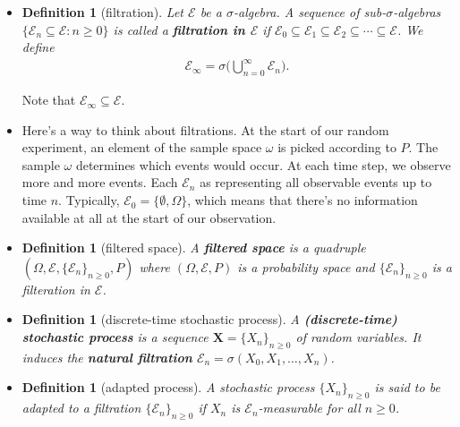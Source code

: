 \documentclass[10pt]{article}
\newtheorem{definition}[lemma]{Definition}
\numberwithin{lemma}{section}
\newcommand{\ve}[1]{\mathbf{#1}}
\newcommand{\mcal}[1]{\mathcal{#1}}
\begin{document}
\begin{itemize}
  \item \begin{definition}[filtration]
    Let $\mcal{E}$ be a $\sigma$-algebra. A sequence of sub-$\sigma$-algebras $\{ \mcal{E}_n \subseteq \mcal{E} : n \geq 0 \}$ is called a {\bf filtration in $\mcal{E}$} if $\mcal{E}_0 \subseteq \mcal{E}_1 \subseteq \mcal{E}_2 \subseteq \dotsb \subseteq \mcal{E}$. We define
    \begin{align*}
      \mcal{E}_\infty = \sigma \bigg( \bigcup_{n=0}^\infty \mcal{E}_n \bigg).
    \end{align*}
  \end{definition}
  Note that $\mcal{E}_\infty \subseteq \mcal{E}$.

  \item Here's a way to think about filtrations. At the start of our random experiment, an element of the sample space $\omega$ is picked according to $P$. The sample $\omega$ determines which events would occur. At each time step, we observe more and more events. Each $\mcal{E}_n$ as representing all observable events up to time $n$. Typically, $\mcal{E}_0 = \{ \emptyset, \Omega \}$, which means that there's no information available at all at the start of our observation.

  \item \begin{definition}[filtered space]
    A {\bf filtered space} is a quadruple $(\Omega, \mcal{E}, \{ \mcal{E}_n \}_{n \geq 0}, P)$ where $(\Omega, \mcal{E}, P)$ is a probability space and $\{ \mcal{E}_n \}_{n \geq 0}$ is a filteration in $\mcal{E}$.
  \end{definition}

  \item \begin{definition}[discrete-time stochastic process]
    A {\bf (discrete-time) stochastic process} is a sequence $\ve{X} = \{ X_n \}_{n \geq 0}$ of random variables. It induces the {\bf natural filtration} $\mcal{E}_n = \sigma(X_0, X_1, \dotsc, X_n)$.
  \end{definition}

  \item \begin{definition}[adapted process]
    A stochastic process $\{ X_n \}_{n \geq 0}$ is said to be adapted to a filtration $\{ \mcal{E}_n \}_{n \geq 0}$ if $X_n$ is $\mcal{E}_n$-measurable for all $n \geq 0$.
  \end{definition} 


\end{itemize}
\end{document}
